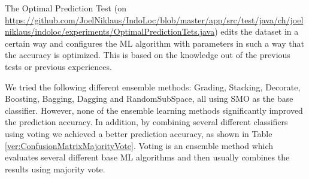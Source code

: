 The Optimal Prediction Test (on  \url{https://github.com/JoelNiklaus/IndoLoc/blob/master/app/src/test/java/ch/joelniklaus/indoloc/experiments/OptimalPredictionTets.java}) edits the dataset in a certain way and configures the ML algorithm with parameters in such a way that the accuracy is optimized. This is based on the knowledge out of the previous tests or previous experiences.

We tried the following different ensemble methods: Grading, Stacking, Decorate, Boosting, Bagging, Dagging and RandomSubSpace, all using SMO as the base classifier. However, none of the ensemble learning methods significantly improved the prediction accuracy. In addition, by combining several different classifiers using voting we achieved a better prediction accuracy, as shown in Table \ref{ver:ConfusionMatrixMajorityVote}. Voting is an ensemble method which evaluates several different base ML algorithms and then usually combines the results using majority vote.

